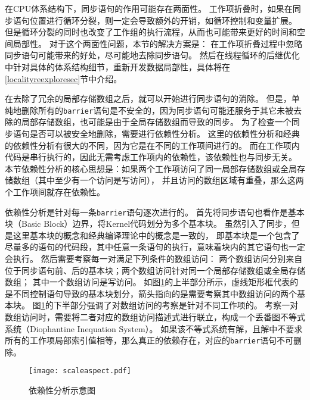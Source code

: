 在CPU体系结构下，同步语句的作用可能存在两面性。
工作项折叠时，如果在同步语句位置进行循环分裂，则一定会导致额外的开销，如循环控制和变量扩展。
但是循环分裂的同时也改变了工作组的执行流程，从而也可能带来更好的时间和空间局部性。
对于这个两面性问题，本节的解决方案是：
在工作项折叠过程中忽略同步语句可能带来的好处，尽可能地去除同步语句。
然后在线程循环的后继优化中针对具体的体系结构细节，重新开发数据局部性，具体将在\ref{localityreexploresec}节中介绍。

在去除了冗余的局部存储数组之后，就可以开始进行同步语句的消除。
但是，单纯地删除所有的\texttt{barrier}语句是不安全的，因为同步语句可能还服务于其它未被去除的局部存储数组，也可能是由于全局存储数组而导致的同步。
为了检查一个同步语句是否可以被安全地删除，需要进行依赖性分析。
这里的依赖性分析和经典的依赖性分析有很大的不同，因为它是在不同的工作项间进行的。
而在工作项内代码是串行执行的，因此无需考虑工作项内的依赖性，该依赖性也与同步无关。
本节依赖性分析的核心思想是：如果两个工作项访问了同一局部存储数组或全局存储数组（其中至少有一个访问是写访问），
并且访问的数组区域有重叠，那么这两个工作项间就存在依赖性。

依赖性分析是针对每一条\texttt{barrier}语句逐次进行的。
首先将同步语句也看作是基本块（Basic Block）边界，将Kernel代码划分为多个基本块。
虽然引入了同步，但是这里基本块的概念和经典编译理论中的概念是一致的，
即基本块是一个包含了尽量多的语句的代码段，其中任意一条语句的执行，意味着块内的其它语句也一定会执行。
然后需要考察每一对满足下列条件的数组访问：
两个数组访问分别来自位于同步语句前、后的基本块；两个数组访问针对同一个局部存储数组或全局存储数组；
其中一个数组访问是写访问。
如图\ref{dependence}的上半部分所示，虚线矩形框代表的是不同控制语句导致的基本块划分，箭头指向的是需要考察其中数组访问的两个基本块。
图\ref{dependence}的下半部分强调了对数组访问的考察是针对不同工作项的。
考察一对数组访问时，需要将二者对应的数组访问描述式进行联立，构成一个丢番图不等式系统（Diophantine Inequation System）。
如果该不等式系统有解，且解中不要求所有的工作项局部索引值相等，那么真正的依赖存在，对应的\texttt{barrier}语句不可删除。

\begin{figure}
	\centering
	\texttt{[image: scaleaspect.pdf]}
	\caption{依赖性分析示意图}
	\label{dependence}
\end{figure}

